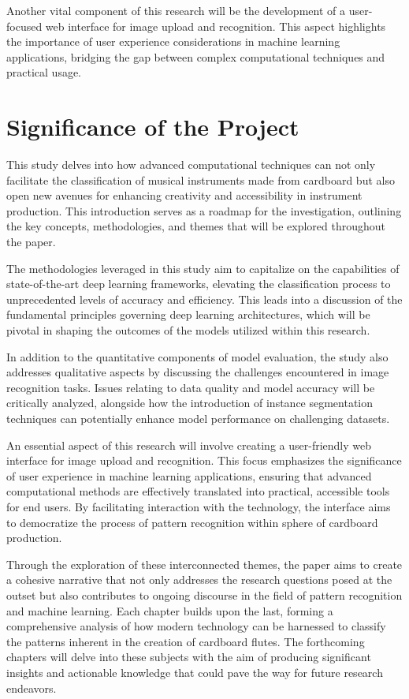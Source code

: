 Another vital component of this research will be the development of a user-focused web interface for image upload and recognition. This aspect highlights the importance of user experience considerations in machine learning applications, bridging the gap between complex computational techniques and practical usage.


\section{Significance of the Project}

This study delves into how advanced computational techniques can not only facilitate the classification of musical instruments made from cardboard but also open new avenues for enhancing creativity and accessibility in instrument production. This introduction serves as a roadmap for the investigation, outlining the key concepts, methodologies, and themes that will be explored throughout the paper.

The methodologies leveraged in this study aim to capitalize on the capabilities of state-of-the-art deep learning frameworks, elevating the classification process to unprecedented levels of accuracy and efficiency. This leads into a discussion of the fundamental principles governing deep learning architectures, which will be pivotal in shaping the outcomes of the models utilized within this research.

In addition to the quantitative components of model evaluation, the study also addresses qualitative aspects by discussing the challenges encountered in image recognition tasks. Issues relating to data quality and model accuracy will be critically analyzed, alongside how the introduction of instance segmentation techniques can potentially enhance model performance on challenging datasets.

An essential aspect of this research will involve creating a user-friendly web interface for image upload and recognition. This focus emphasizes the significance of user experience in machine learning applications, ensuring that advanced computational methods are effectively translated into practical, accessible tools for end users. By facilitating interaction with the technology, the interface aims to democratize the process of pattern recognition within sphere of cardboard production.

Through the exploration of these interconnected themes, the paper aims to create a cohesive narrative that not only addresses the research questions posed at the outset but also contributes to ongoing discourse in the field of pattern recognition and machine learning. Each chapter builds upon the last, forming a comprehensive analysis of how modern technology can be harnessed to classify the patterns inherent in the creation of cardboard flutes. The forthcoming chapters will delve into these subjects with the aim of producing significant insights and actionable knowledge that could pave the way for future research endeavors.

